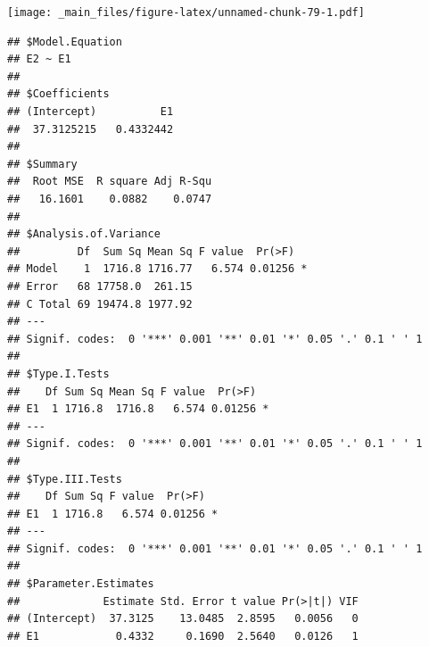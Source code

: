 \documentclass[
]{book}
\newenvironment{Shaded}{\begin{snugshade}}{\end{snugshade}}
\newcommand{\AttributeTok}[1]{\textcolor[rgb]{0.77,0.63,0.00}{#1}}
\newcommand{\DecValTok}[1]{\textcolor[rgb]{0.00,0.00,0.81}{#1}}
\newcommand{\FunctionTok}[1]{\textcolor[rgb]{0.00,0.00,0.00}{#1}}
\newcommand{\NormalTok}[1]{#1}
\newcommand{\SpecialCharTok}[1]{\textcolor[rgb]{0.00,0.00,0.00}{#1}}
\begin{document}
\begin{Shaded}
\end{Shaded}

\texttt{[image: \_main\_files/figure-latex/unnamed-chunk-79-1.pdf]}

\begin{verbatim}
## $Model.Equation
## E2 ~ E1
## 
## $Coefficients
## (Intercept)          E1 
##  37.3125215   0.4332442 
## 
## $Summary
##  Root MSE  R square Adj R-Squ 
##   16.1601    0.0882    0.0747 
## 
## $Analysis.of.Variance
##         Df  Sum Sq Mean Sq F value  Pr(>F)  
## Model    1  1716.8 1716.77   6.574 0.01256 *
## Error   68 17758.0  261.15                  
## C Total 69 19474.8 1977.92                  
## ---
## Signif. codes:  0 '***' 0.001 '**' 0.01 '*' 0.05 '.' 0.1 ' ' 1
## 
## $Type.I.Tests
##    Df Sum Sq Mean Sq F value  Pr(>F)  
## E1  1 1716.8  1716.8   6.574 0.01256 *
## ---
## Signif. codes:  0 '***' 0.001 '**' 0.01 '*' 0.05 '.' 0.1 ' ' 1
## 
## $Type.III.Tests
##    Df Sum Sq F value  Pr(>F)  
## E1  1 1716.8   6.574 0.01256 *
## ---
## Signif. codes:  0 '***' 0.001 '**' 0.01 '*' 0.05 '.' 0.1 ' ' 1
## 
## $Parameter.Estimates
##             Estimate Std. Error t value Pr(>|t|) VIF
## (Intercept)  37.3125    13.0485  2.8595   0.0056   0
## E1            0.4332     0.1690  2.5640   0.0126   1
\end{verbatim}
\end{document}
